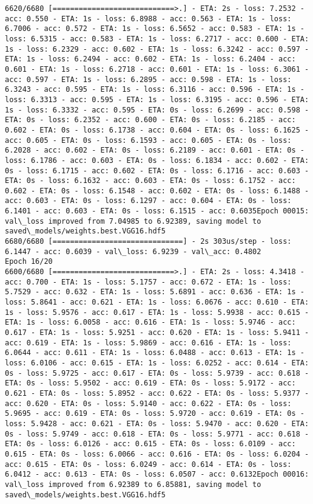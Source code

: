 \documentclass[11pt]{article}
\begin{document}
\begin{Verbatim}[commandchars=\\\{\}]
6620/6680 [============================>.] - ETA: 2s - loss: 7.2532 - acc: 0.550 - ETA: 1s - loss: 6.8988 - acc: 0.563 - ETA: 1s - loss: 6.7006 - acc: 0.572 - ETA: 1s - loss: 6.5652 - acc: 0.583 - ETA: 1s - loss: 6.5315 - acc: 0.583 - ETA: 1s - loss: 6.2717 - acc: 0.600 - ETA: 1s - loss: 6.2329 - acc: 0.602 - ETA: 1s - loss: 6.3242 - acc: 0.597 - ETA: 1s - loss: 6.2494 - acc: 0.602 - ETA: 1s - loss: 6.2404 - acc: 0.601 - ETA: 1s - loss: 6.2718 - acc: 0.601 - ETA: 1s - loss: 6.3061 - acc: 0.597 - ETA: 1s - loss: 6.2895 - acc: 0.598 - ETA: 1s - loss: 6.3243 - acc: 0.595 - ETA: 1s - loss: 6.3116 - acc: 0.596 - ETA: 1s - loss: 6.3313 - acc: 0.595 - ETA: 1s - loss: 6.3195 - acc: 0.596 - ETA: 1s - loss: 6.3332 - acc: 0.595 - ETA: 0s - loss: 6.2699 - acc: 0.598 - ETA: 0s - loss: 6.2352 - acc: 0.600 - ETA: 0s - loss: 6.2185 - acc: 0.602 - ETA: 0s - loss: 6.1738 - acc: 0.604 - ETA: 0s - loss: 6.1625 - acc: 0.605 - ETA: 0s - loss: 6.1593 - acc: 0.605 - ETA: 0s - loss: 6.2028 - acc: 0.602 - ETA: 0s - loss: 6.2189 - acc: 0.601 - ETA: 0s - loss: 6.1786 - acc: 0.603 - ETA: 0s - loss: 6.1834 - acc: 0.602 - ETA: 0s - loss: 6.1715 - acc: 0.602 - ETA: 0s - loss: 6.1716 - acc: 0.603 - ETA: 0s - loss: 6.1632 - acc: 0.603 - ETA: 0s - loss: 6.1752 - acc: 0.602 - ETA: 0s - loss: 6.1548 - acc: 0.602 - ETA: 0s - loss: 6.1488 - acc: 0.603 - ETA: 0s - loss: 6.1297 - acc: 0.604 - ETA: 0s - loss: 6.1401 - acc: 0.603 - ETA: 0s - loss: 6.1515 - acc: 0.6035Epoch 00015: val\_loss improved from 7.04985 to 6.92389, saving model to saved\_models/weights.best.VGG16.hdf5
6680/6680 [==============================] - 2s 303us/step - loss: 6.1447 - acc: 0.6039 - val\_loss: 6.9239 - val\_acc: 0.4802
Epoch 16/20
6600/6680 [============================>.] - ETA: 2s - loss: 4.3418 - acc: 0.700 - ETA: 1s - loss: 5.1757 - acc: 0.672 - ETA: 1s - loss: 5.7529 - acc: 0.632 - ETA: 1s - loss: 5.6891 - acc: 0.636 - ETA: 1s - loss: 5.8641 - acc: 0.621 - ETA: 1s - loss: 6.0676 - acc: 0.610 - ETA: 1s - loss: 5.9576 - acc: 0.617 - ETA: 1s - loss: 5.9938 - acc: 0.615 - ETA: 1s - loss: 6.0058 - acc: 0.616 - ETA: 1s - loss: 5.9746 - acc: 0.617 - ETA: 1s - loss: 5.9251 - acc: 0.620 - ETA: 1s - loss: 5.9411 - acc: 0.619 - ETA: 1s - loss: 5.9869 - acc: 0.616 - ETA: 1s - loss: 6.0644 - acc: 0.611 - ETA: 1s - loss: 6.0488 - acc: 0.613 - ETA: 1s - loss: 6.0106 - acc: 0.615 - ETA: 1s - loss: 6.0252 - acc: 0.614 - ETA: 0s - loss: 5.9725 - acc: 0.617 - ETA: 0s - loss: 5.9739 - acc: 0.618 - ETA: 0s - loss: 5.9502 - acc: 0.619 - ETA: 0s - loss: 5.9172 - acc: 0.621 - ETA: 0s - loss: 5.8952 - acc: 0.622 - ETA: 0s - loss: 5.9377 - acc: 0.620 - ETA: 0s - loss: 5.9140 - acc: 0.622 - ETA: 0s - loss: 5.9695 - acc: 0.619 - ETA: 0s - loss: 5.9720 - acc: 0.619 - ETA: 0s - loss: 5.9428 - acc: 0.621 - ETA: 0s - loss: 5.9470 - acc: 0.620 - ETA: 0s - loss: 5.9749 - acc: 0.618 - ETA: 0s - loss: 5.9771 - acc: 0.618 - ETA: 0s - loss: 6.0126 - acc: 0.615 - ETA: 0s - loss: 6.0109 - acc: 0.615 - ETA: 0s - loss: 6.0066 - acc: 0.616 - ETA: 0s - loss: 6.0204 - acc: 0.615 - ETA: 0s - loss: 6.0249 - acc: 0.614 - ETA: 0s - loss: 6.0412 - acc: 0.613 - ETA: 0s - loss: 6.0507 - acc: 0.6132Epoch 00016: val\_loss improved from 6.92389 to 6.85881, saving model to saved\_models/weights.best.VGG16.hdf5

\end{Verbatim}
\end{document}
